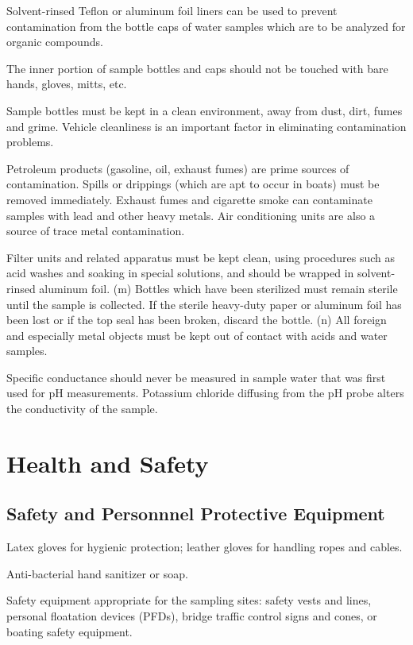 \documentclass[12pt]{../SOP4_alpha}\usepackage[]{graphicx}\usepackage[]{xcolor}
\begin{document}
\NP Solvent-rinsed Teflon or aluminum foil liners can be used to prevent contamination from the bottle caps of water samples which are to be analyzed for organic compounds.

\NP The inner portion of sample bottles and caps should not be touched with bare hands, gloves, mitts, etc. 

\NP Sample bottles must be kept in a clean environment, away from dust, dirt, fumes and grime. Vehicle cleanliness is an important factor in eliminating contamination problems. 

\NP  Petroleum products (gasoline, oil, exhaust fumes) are prime sources of contamination. Spills or drippings (which are apt to occur in boats) must be removed immediately. Exhaust fumes and cigarette smoke can contaminate samples with lead and other heavy metals. Air conditioning units are also a source of trace metal contamination. 

\NP Filter units and related apparatus must be kept clean, using procedures such as acid washes and soaking in special solutions, and should be wrapped in solvent-rinsed aluminum foil. (m) Bottles which have been sterilized must remain sterile until the sample is collected. If the sterile heavy-duty paper or aluminum foil has been lost or if the top seal has been broken, discard the bottle. (n) All foreign and especially metal objects must be kept out of contact with acids and water samples. 

\NP Specific conductance should never be measured in sample water that was first used for pH measurements. Potassium chloride diffusing from the pH probe alters the conductivity of the sample.


\section{Health and Safety}

\subsection{Safety and Personnnel Protective Equipment}

\NP Latex gloves for hygienic protection; leather gloves for handling ropes and cables.  

\NP Anti-bacterial hand sanitizer or soap.

\NP Safety equipment appropriate for the sampling sites: safety vests and lines, personal floatation devices (PFDs), bridge traffic control signs and cones, or boating safety equipment.  
\end{document}
